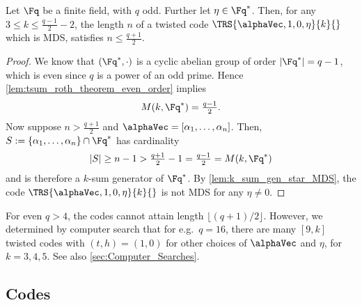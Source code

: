 \documentclass[conference,a4paper]{IEEEtran}
\begin{document}
\begin{theorem}\label{thm:inverse_mds_statement_very_simple_twist}
Let $\Fq$ be a finite field, with $q$ odd. Further let $\eta \in \Fq^*$. Then, for any $3 \leq k \leq \tfrac{q-1}{2}-2$, the length $n$ of a twisted code $\TRS{\alphaVec,1,0,\eta}{k}{}$ which is MDS, satisfies
$
n \leq \frac{q+1}{2}.
$
\end{theorem}

\begin{proof}
We know that $(\Fq^*,\cdot)$ is a cyclic abelian group of order $|\Fq^*|=q-1$, which is even since $q$ is a power of an odd prime. Hence \cref{lem:tsum_roth_theorem_even_order} implies
\begin{align*}
M(k,\Fq^*) = \tfrac{q-1}{2}.
\end{align*}
Now suppose $n>\tfrac{q+1}{2}$ and $\alphaVec=[\alpha_1,\dots,\alpha_n]$. Then, $S := \{\alpha_1,\dots,\alpha_n\} \cap \Fq^*$ has cardinality
\begin{align*}
|S| \geq n-1 > \tfrac{q+1}{2}-1 = \tfrac{q-1}{2} = M(k,\Fq^*)
\end{align*}
and is therefore a $k$-sum generator of $\Fq^*$.
By \cref{lem:k_sum_gen_star_MDS}, the code $\TRS{\alphaVec,1,0,\eta}{k}{}$ is not MDS for any $\eta \neq 0$.
\end{proof}

\begin{remark}
For even $q>4$, the \startw codes cannot attain length $\lfloor(q+1)/2\rfloor$. However, we determined by computer search that for e.g.~$q=16$, there are many $[9,k]$ twisted codes with $(t,h)=(1,0)$ for other choices of $\alphaVec$ and $\eta$, for $k = 3,4,5$.
See also \cref{sec:Computer_Searches}.
\end{remark}


\subsection{\plustw Codes}
\label{ssec:Max_Length_MDS_Additive-Primitively_Twisted}
\end{document}
